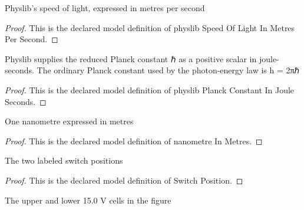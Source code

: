 \begin{definition}
  \label{def:physics:phyx-mini-0612:phyxminiproblems-problemphyxmini0612-physlibspeedoflightinmetrespersecond}
  Physlib's speed of light, expressed in metres per second
\end{definition}
\begin{proof}
  This is the declared model definition of physlib Speed Of Light In Metres Per Second.
\end{proof}
\begin{definition}
  \label{def:physics:phyx-mini-0612:phyxminiproblems-problemphyxmini0612-physlibplanckconstantinjouleseconds}
  Physlib supplies the reduced Planck constant ℏ as a positive scalar in joule-seconds. The ordinary Planck constant used by the photon-energy law is h = 2πℏ
\end{definition}
\begin{proof}
  This is the declared model definition of physlib Planck Constant In Joule Seconds.
\end{proof}
\begin{definition}
  \label{def:physics:phyx-mini-0612:phyxminiproblems-problemphyxmini0612-nanometreinmetres}
  One nanometre expressed in metres
\end{definition}
\begin{proof}
  This is the declared model definition of nanometre In Metres.
\end{proof}
\begin{definition}
  \label{def:physics:phyx-mini-0612:phyxminiproblems-problemphyxmini0612-switchposition}
  The two labeled switch positions
\end{definition}
\begin{proof}
  This is the declared model definition of Switch Position.
\end{proof}
\begin{definition}
  \label{def:physics:phyx-mini-0612:phyxminiproblems-problemphyxmini0612-figurebattery}
  The upper and lower 15.0 V cells in the figure
\end{definition}
